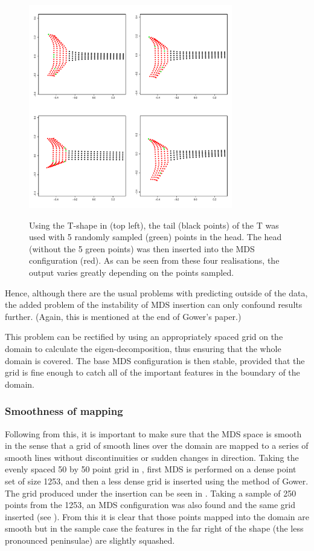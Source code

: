 \begin{figure}
\centering
\includegraphics[width=3.5in]{mds/figs/tshaperand.pdf} \\
\caption{Using the T-shape in  (top left), the tail (black points) of the T was used with 5 randomly sampled (green) points in the head. The head (without the 5 green points) was then inserted into the MDS configuration (red). As can be seen from these four realisations, the output varies greatly depending on the points sampled.}
\label{tshaperand}
\end{figure}

Hence, although there are the usual problems with predicting outside of the data, the added problem of the instability of MDS insertion can only confound results further. (Again, this is mentioned at the end of Gower's paper.)

This problem can be rectified by using an appropriately spaced grid on the domain to calculate the eigen-decomposition, thus ensuring that the whole domain is covered. The base MDS configuration is then stable, provided that the grid is fine enough to catch all of the important features in the boundary of the domain.

\subsubsection{Smoothness of mapping}

Following from this, it is important to make sure that the MDS space is smooth in the sense that a grid of smooth lines over the domain are mapped to a series of smooth lines without discontinuities or sudden changes in direction. Taking the evenly spaced 50 by 50 point grid in , first MDS is performed on a dense point set of size 1253, and then a less dense grid is inserted using the method of Gower. The grid produced under the insertion can be seen in . Taking a sample of 250 points from the 1253, an MDS configuration was also found and the same grid inserted (see ). From this it is clear that those points mapped into the domain are smooth but in the sample case the features in the far right of the shape (the less pronounced peninsulae) are slightly squashed.

